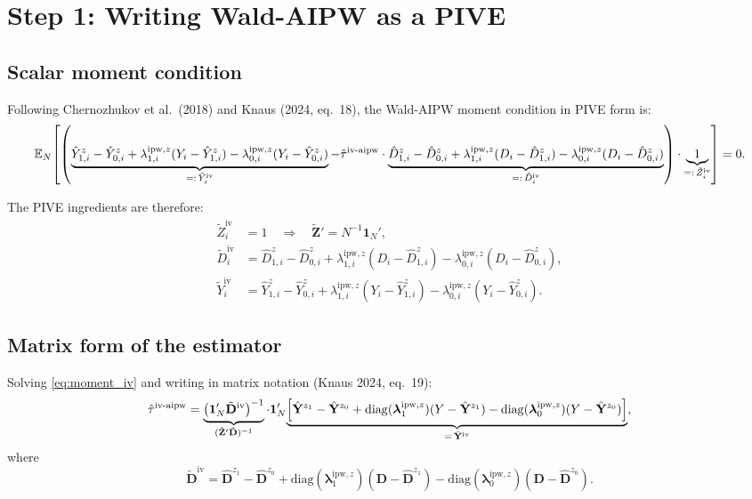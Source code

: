\documentclass[12pt, a4paper]{article}
\theoremstyle{condstyle}
\theoremstyle{plain}
\newcommand{\EN}{\mathbb{E}_N}
\newcommand{\bone}{\mathbf{1}_N}
\newcommand{\bD}{\mathbf{D}}
\newcommand{\Yhz}[1]{\hat{\mathbf{Y}}^{z_{#1}}}   %
\newcommand{\Dhz}[1]{\hat{\mathbf{D}}^{z_{#1}}}   %
\newcommand{\lipwz}[1]{\boldsymbol{\lambda}^{\mathrm{ipw},z}_{#1}}
\newcommand{\tiv}{\hat{\tau}^{\mathrm{iv\text{-}aipw}}}
\begin{document}
\section{Step 1: Writing Wald-AIPW as a PIVE}
\label{sec:step1}

\subsection{Scalar moment condition}

Following Chernozhukov et al.\ (2018) and Knaus (2024, eq.~18),
the Wald-AIPW moment condition in PIVE form is:
\begin{equation}
  \EN\!\left[
    \left(
      \underbrace{%
        \hat{Y}^z_{1,i}-\hat{Y}^z_{0,i}
        +\lambda^{\mathrm{ipw},z}_{1,i}(Y_i-\hat{Y}^z_{1,i})
        -\lambda^{\mathrm{ipw},z}_{0,i}(Y_i-\hat{Y}^z_{0,i})
      }_{=:\,\tilde{Y}^{\mathrm{iv}}_i}
      -\tiv\cdot
      \underbrace{%
        \hat{D}^z_{1,i}-\hat{D}^z_{0,i}
        +\lambda^{\mathrm{ipw},z}_{1,i}(D_i-\hat{D}^z_{1,i})
        -\lambda^{\mathrm{ipw},z}_{0,i}(D_i-\hat{D}^z_{0,i})
      }_{=:\,\tilde{D}^{\mathrm{iv}}_i}
    \right)\cdot
    \underbrace{1}_{=:\,\tilde{Z}^{\mathrm{iv}}_i}
  \right] = 0.
  \label{eq:moment_iv}
\end{equation}

The PIVE ingredients are therefore:
\begin{align*}
  \tilde{Z}^{\mathrm{iv}}_i &= 1 \quad\Rightarrow\quad \tilde{\mathbf{Z}}' = N^{-1}\bone',\\[3pt]
  \tilde{D}^{\mathrm{iv}}_i &= \hat{D}^z_{1,i}-\hat{D}^z_{0,i}
    +\lambda^{\mathrm{ipw},z}_{1,i}(D_i-\hat{D}^z_{1,i})
    -\lambda^{\mathrm{ipw},z}_{0,i}(D_i-\hat{D}^z_{0,i}),\\[3pt]
  \tilde{Y}^{\mathrm{iv}}_i &= \hat{Y}^z_{1,i}-\hat{Y}^z_{0,i}
    +\lambda^{\mathrm{ipw},z}_{1,i}(Y_i-\hat{Y}^z_{1,i})
    -\lambda^{\mathrm{ipw},z}_{0,i}(Y_i-\hat{Y}^z_{0,i}).
\end{align*}

\subsection{Matrix form of the estimator}

Solving \eqref{eq:moment_iv} and writing in matrix notation (Knaus 2024, eq.~19):
\begin{equation}
  \tiv
  = \underbrace{%
      \left(\bone'\tilde{\mathbf{D}}^{\mathrm{iv}}\right)^{-1}
    }_{(\tilde{\mathbf{Z}}'\tilde{\mathbf{D}})^{-1}}
    \cdot
    \bone'\!
    \underbrace{%
      \left[\Yhz{1}-\Yhz{0}
        +\mathrm{diag}(\lipwz{1})(Y-\Yhz{1})
        -\mathrm{diag}(\lipwz{0})(Y-\Yhz{0})\right]
    }_{=\,\tilde{\mathbf{Y}}^{\mathrm{iv}}},
  \label{eq:wald_aipw_matrix}
\end{equation}
where
\begin{equation}
  \tilde{\mathbf{D}}^{\mathrm{iv}}
  = \Dhz{1}-\Dhz{0}
    +\mathrm{diag}(\lipwz{1})(\bD-\Dhz{1})
    -\mathrm{diag}(\lipwz{0})(\bD-\Dhz{0}).
  \label{eq:Dtilde_iv_vec}
\end{equation}
\end{document}
